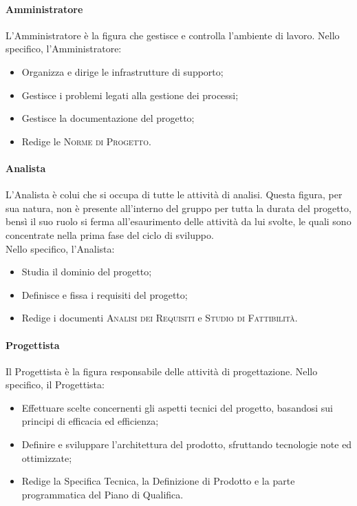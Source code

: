 \documentclass[../norme-di-progetto.tex]{subfiles}
\begin{document}
\paragraph{Amministratore}
L'Amministratore è la figura che gestisce e controlla l'ambiente di lavoro. Nello specifico, l'Amministratore:
\begin{itemize}
  \item Organizza e dirige le infrastrutture di supporto;
  \item Gestisce i problemi legati alla gestione dei processi;
  \item Gestisce la documentazione del progetto;
  \item Redige le \textsc{Norme di Progetto}.
\end{itemize}

\paragraph{Analista}
L'Analista è colui che si occupa di tutte le attività di analisi. Questa figura, per sua natura, non è presente all'interno del gruppo per tutta la durata del progetto, bensì il suo ruolo si ferma all'esaurimento delle attività da lui svolte, le quali sono concentrate nella prima fase del ciclo di sviluppo. \\
Nello specifico, l'Analista:
\begin{itemize}
  \item Studia il dominio del progetto;
  \item Definisce e fissa i requisiti del progetto;
  \item Redige i documenti \textsc{Analisi dei Requisiti} e \textsc{Studio di Fattibilità}.
\end{itemize}

\paragraph{Progettista}
Il Progettista è la figura responsabile delle attività di progettazione. Nello specifico, il Progettista:
\begin{itemize}
  \item Effettuare scelte concernenti gli aspetti tecnici del progetto, basandosi sui principi di efficacia ed efficienza;
  \item Definire e sviluppare l'architettura del prodotto, sfruttando tecnologie note ed ottimizzate;
  \item Redige la Specifica Tecnica, la Definizione di Prodotto e la parte programmatica del Piano di Qualifica.
\end{itemize}
\end{document}

